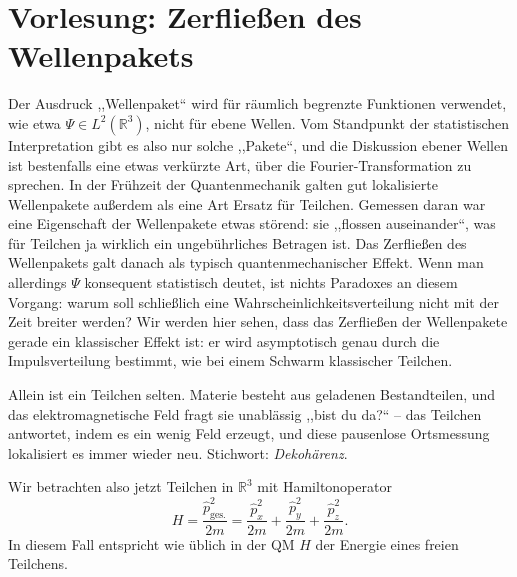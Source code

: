 

\section{Vorlesung: Zerfließen des Wellenpakets}
Der Ausdruck ,,Wellenpaket`` wird für räumlich begrenzte Funktionen verwendet, wie etwa $\Psi\in L^2(\mathbb{R}^3)$, nicht für ebene Wellen. Vom Standpunkt der statistischen Interpretation gibt es also nur solche ,,Pakete``, und die Diskussion ebener Wellen ist bestenfalls eine etwas verkürzte Art, über die Fourier-Transformation zu sprechen. In der Frühzeit der Quantenmechanik galten gut lokalisierte Wellenpakete außerdem als eine Art Ersatz für Teilchen. Gemessen
daran war eine Eigenschaft der Wellenpakete etwas störend: sie ,,flossen auseinander``,  was für Teilchen ja wirklich ein ungebührliches Betragen ist. Das Zerfließen des Wellenpakets galt danach als typisch quantenmechanischer Effekt. Wenn man allerdings $\Psi$ konsequent statistisch deutet, ist nichts Paradoxes an diesem Vorgang: warum soll schließlich eine Wahrscheinlichkeitsverteilung
nicht mit der Zeit breiter werden? Wir werden hier sehen, dass das Zerfließen der Wellenpakete gerade ein klassischer Effekt ist: er wird asymptotisch genau durch die Impulsverteilung bestimmt, wie bei einem Schwarm klassischer Teilchen.

\begin{greybox}
	Allein ist ein Teilchen selten. Materie besteht aus geladenen Bestandteilen, und das elektromagnetische Feld fragt sie unablässig ,,bist du da?`` -- das Teilchen antwortet, indem es ein wenig Feld erzeugt, und diese pausenlose Ortsmessung lokalisiert es immer wieder neu. Stichwort: \emph{Dekohärenz}.
\end{greybox}

Wir betrachten also jetzt Teilchen in $\mathbb{R}^3$ mit Hamiltonoperator
\begin{equation}
	H = \frac{\widehat{p}_\text{ges.}^2}{2m} = \frac{\widehat{p}_{x}^2}{2m}+\frac{\widehat{p}_{y}^2}{2m}+\frac{\widehat{p}_{z}^2}{2m}.
\end{equation}
In diesem Fall entspricht wie üblich in der QM $H$ der Energie eines freien Teilchens. 

